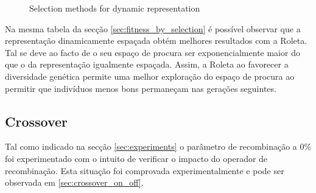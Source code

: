 \documentclass[a4paper]{article}
\begin{document}
\begin{figure}[ht]
	\centering
	\caption{Selection methods for dynamic representation}
\end{figure}
\indent Na mesma tabela da secção \ref{sec:fitness_by_selection} é possível observar que a representação dinamicamente espaçada obtém melhores resultados com a Roleta.
Tal se deve ao facto de o seu espaço de procura ser exponencialmente maior do que o da representação igualmente espaçada. Assim, a Roleta ao favorecer a diversidade
genética permite uma melhor exploração do espaço de procura ao permitir que indivíduos menos bons permaneçam nas gerações seguintes.

\cleardoublepage

\subsection{Crossover}
\indent \indent Tal como indicado na secção \ref{sec:experiments} o parâmetro de recombinação a 0\% foi experimentado com o
intuito de verificar o impacto do operador de recombinação. Esta situação foi comprovada experimentalmente e pode ser observada em \ref{sec:crossover_on_off}.
\end{document}
